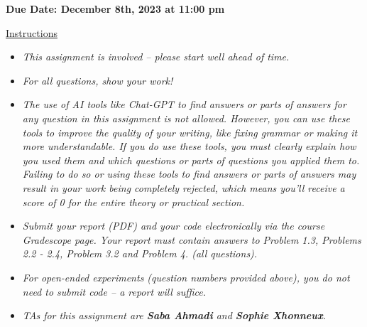 \documentclass[12pt]{article}
\theoremstyle{definition}
\begin{document}
\fancyhead{}
\fancyfoot{}


{\bf Due Date: December 8th, 2023 at 11:00 pm}


\underline{Instructions}
\renewcommand{\labelitemi}{\textbullet}
\begin{itemize}
\item \emph{This assignment is involved -- please start well ahead of time.}
\item \emph{For all questions, show your work!}
\item \emph{The use of AI tools like Chat-GPT to find answers or parts of answers for any question in this assignment is not allowed. However, you can use these tools to improve the quality of your writing, like fixing grammar or making it more understandable. If you do use these tools, you must clearly explain how you used them and which questions or parts of questions you applied them to. Failing to do so or using these tools to find answers or parts of answers may result in your work being completely rejected, which means you'll receive a score of 0 for the entire theory or practical section.}
\item \emph{Submit your report (PDF) and your code electronically via the course Gradescope page. Your report must contain answers to Problem 1.3, Problems 2.2 - 2.4, Problem 3.2 and Problem 4.  (all questions).}
\item \emph{For open-ended experiments (question numbers provided above), you do not need to submit code -- a report will suffice.}
\item \emph{{TAs for this assignment are \textbf{Saba Ahmadi} and \textbf{Sophie Xhonneux}.}}
\end{itemize}

\vspace{1mm}
\end{document}
